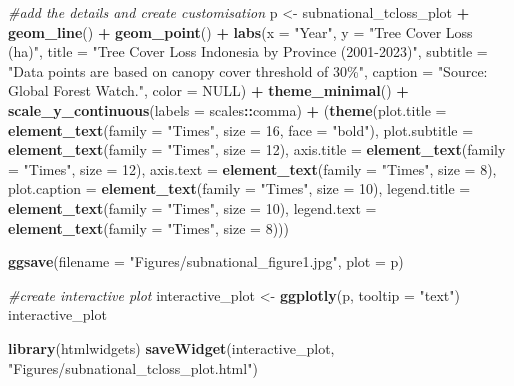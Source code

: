 \documentclass[
]{article}
\newenvironment{Shaded}{\begin{snugshade}}{\end{snugshade}}
\newcommand{\AttributeTok}[1]{\textcolor[rgb]{0.13,0.29,0.53}{#1}}
\newcommand{\CommentTok}[1]{\textcolor[rgb]{0.56,0.35,0.01}{\textit{#1}}}
\newcommand{\ConstantTok}[1]{\textcolor[rgb]{0.56,0.35,0.01}{#1}}
\newcommand{\DecValTok}[1]{\textcolor[rgb]{0.00,0.00,0.81}{#1}}
\newcommand{\FunctionTok}[1]{\textcolor[rgb]{0.13,0.29,0.53}{\textbf{#1}}}
\newcommand{\NormalTok}[1]{#1}
\newcommand{\OtherTok}[1]{\textcolor[rgb]{0.56,0.35,0.01}{#1}}
\newcommand{\SpecialCharTok}[1]{\textcolor[rgb]{0.81,0.36,0.00}{\textbf{#1}}}
\newcommand{\StringTok}[1]{\textcolor[rgb]{0.31,0.60,0.02}{#1}}
\begin{document}
\begin{Shaded}
\begin{Highlighting}[]
\CommentTok{\#add the details and create customisation}
\NormalTok{p }\OtherTok{\textless{}{-}}\NormalTok{ subnational\_tcloss\_plot }\SpecialCharTok{+} \FunctionTok{geom\_line}\NormalTok{() }\SpecialCharTok{+} \FunctionTok{geom\_point}\NormalTok{() }\SpecialCharTok{+}
  \FunctionTok{labs}\NormalTok{(}\AttributeTok{x =} \StringTok{"Year"}\NormalTok{, }\AttributeTok{y =} \StringTok{"Tree Cover Loss (ha)"}\NormalTok{,}
       \AttributeTok{title =} \StringTok{"Tree Cover Loss Indonesia by Province (2001{-}2023)"}\NormalTok{,}
       \AttributeTok{subtitle =} \StringTok{"Data points are based on canopy cover threshold of 30\%"}\NormalTok{,}
       \AttributeTok{caption =} \StringTok{"Source: Global Forest Watch."}\NormalTok{, }\AttributeTok{color =} \ConstantTok{NULL}\NormalTok{) }\SpecialCharTok{+}
  \FunctionTok{theme\_minimal}\NormalTok{() }\SpecialCharTok{+} \FunctionTok{scale\_y\_continuous}\NormalTok{(}\AttributeTok{labels =}\NormalTok{ scales}\SpecialCharTok{::}\NormalTok{comma) }\SpecialCharTok{+}
\NormalTok{  (}\FunctionTok{theme}\NormalTok{(}\AttributeTok{plot.title =} \FunctionTok{element\_text}\NormalTok{(}\AttributeTok{family =} \StringTok{"Times"}\NormalTok{, }\AttributeTok{size =} \DecValTok{16}\NormalTok{, }\AttributeTok{face =} \StringTok{"bold"}\NormalTok{),}
         \AttributeTok{plot.subtitle =} \FunctionTok{element\_text}\NormalTok{(}\AttributeTok{family =} \StringTok{"Times"}\NormalTok{, }\AttributeTok{size =} \DecValTok{12}\NormalTok{),}
         \AttributeTok{axis.title =} \FunctionTok{element\_text}\NormalTok{(}\AttributeTok{family =} \StringTok{"Times"}\NormalTok{, }\AttributeTok{size =} \DecValTok{12}\NormalTok{),}
         \AttributeTok{axis.text =} \FunctionTok{element\_text}\NormalTok{(}\AttributeTok{family =} \StringTok{"Times"}\NormalTok{, }\AttributeTok{size =} \DecValTok{8}\NormalTok{), }
         \AttributeTok{plot.caption =} \FunctionTok{element\_text}\NormalTok{(}\AttributeTok{family =} \StringTok{"Times"}\NormalTok{, }\AttributeTok{size =} \DecValTok{10}\NormalTok{),}
         \AttributeTok{legend.title =} \FunctionTok{element\_text}\NormalTok{(}\AttributeTok{family =} \StringTok{"Times"}\NormalTok{, }\AttributeTok{size =} \DecValTok{10}\NormalTok{),}
         \AttributeTok{legend.text =} \FunctionTok{element\_text}\NormalTok{(}\AttributeTok{family =} \StringTok{"Times"}\NormalTok{, }\AttributeTok{size =} \DecValTok{8}\NormalTok{)))}

\FunctionTok{ggsave}\NormalTok{(}\AttributeTok{filename =} \StringTok{"Figures/subnational\_figure1.jpg"}\NormalTok{, }\AttributeTok{plot =}\NormalTok{ p)}


\CommentTok{\#create interactive plot}
\NormalTok{interactive\_plot }\OtherTok{\textless{}{-}} \FunctionTok{ggplotly}\NormalTok{(p, }\AttributeTok{tooltip =} \StringTok{"text"}\NormalTok{)}
\NormalTok{interactive\_plot}

\FunctionTok{library}\NormalTok{(htmlwidgets)}
\FunctionTok{saveWidget}\NormalTok{(interactive\_plot, }\StringTok{"Figures/subnational\_tcloss\_plot.html"}\NormalTok{)}
\end{Highlighting}
\end{Shaded}
\end{document}
